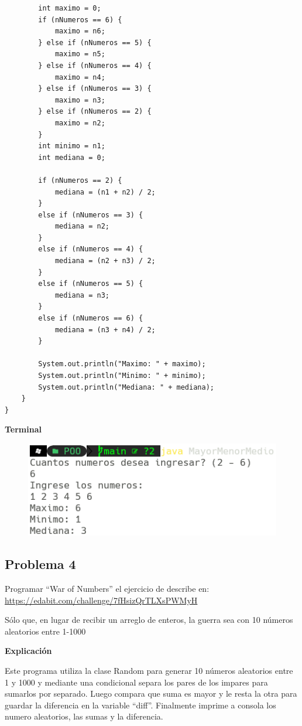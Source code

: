 \documentclass[11pt, twocolumn]{article}
\begin{document}
\begin{lstlisting}
        int maximo = 0;
        if (nNumeros == 6) {
            maximo = n6;
        } else if (nNumeros == 5) {
            maximo = n5;
        } else if (nNumeros == 4) {
            maximo = n4;
        } else if (nNumeros == 3) {
            maximo = n3;
        } else if (nNumeros == 2) {
            maximo = n2;
        }
        int minimo = n1;
        int mediana = 0;

        if (nNumeros == 2) {
            mediana = (n1 + n2) / 2;
        }
        else if (nNumeros == 3) {
            mediana = n2;
        }
        else if (nNumeros == 4) {
            mediana = (n2 + n3) / 2;
        }
        else if (nNumeros == 5) {
            mediana = n3;
        }
        else if (nNumeros == 6) {
            mediana = (n3 + n4) / 2;
        }    
        
        System.out.println("Maximo: " + maximo);
        System.out.println("Minimo: " + minimo);
        System.out.println("Mediana: " + mediana);
    }
}
    \end{lstlisting}

    \textbf{Terminal}
    \begin{figure}[ht]
        \includegraphics[width=0.75\columnwidth, center]{P3.png}
    \end{figure}

    \subsection*{Problema 4}
    Programar ``War of Numbers'' el ejercicio de describe en: \\
    \url{https://edabit.com/challenge/7fHsizQrTLXsPWMyH}

    Sólo que, en lugar de recibir un arreglo de enteros, la guerra sea con 10 números aleatorios entre 1-1000

    \textbf{Explicación} 
 
    Este programa utiliza la clase Random para generar 10 números aleatorios entre 1 y 1000 y mediante una condicional separa los pares de los impares para sumarlos por separado. Luego compara que suma es mayor y le resta la otra para guardar la diferencia en la variable ``diff''. Finalmente imprime a consola los numero aleatorios, las sumas y la diferencia.
\end{document}

